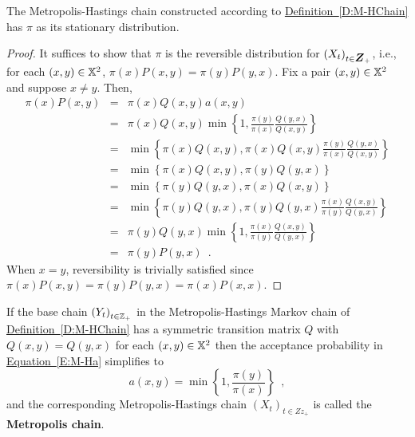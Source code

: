 \begin{prop}\label{P:M-HChainStationary}
The Metropolis-Hastings chain constructed according to \hyperref[D:M-HChain]{Definition~\ref*{D:M-HChain}} has $\pi$ as its stationary distribution.  
\begin{proof}
It suffices to show that $\pi$ is the reversible distribution for $\left(X_t\right)_{t\in \Z_+}$, i.e., for each $(x,y) \in \mathbb{X}^2$, $\pi(x)P(x,y) = \pi(y) P(y,x)$.  
Fix a pair $(x,y) \in \mathbb{X}^2$ and suppose $x\neq y$.  
Then,
\begin{eqnarray*}
\pi(x)P(x,y) 
&=& \pi(x) Q(x,y)a(x,y) \\
&=& \pi(x) Q(x,y) \min\left\{ 1, \frac{\pi(y)}{\pi(x)}\frac{Q(y,x)}{Q(x,y)} \right\} \\
&=& \min\left\{ \pi(x) Q(x,y), \pi(x) Q(x,y) \frac{\pi(y)}{\pi(x)}\frac{Q(y,x)}{Q(x,y)} \right\}\\
&=& \min\left\{ \pi(x) Q(x,y), \pi(y) Q(y,x) \right\}\\
&=& \min\left\{ \pi(y) Q(y,x), \pi(x) Q(x,y) \right\}\\
&=& \min\left\{ \pi(y) Q(y,x), \pi(y) Q(y,x) \frac{\pi(x)}{\pi(y)} \frac{Q(x,y)}{Q(y,x)} \right\}\\
&=& \pi(y) Q(y,x) \min\left\{ 1, \frac{\pi(x)}{\pi(y)} \frac{Q(x,y)}{Q(y,x)} \right\}\\
&=& \pi(y) P(y,x) \enspace .
\end{eqnarray*}
When $x=y$, reversibility is trivially satisfied since $\pi(x)P(x,y) = \pi(y) P(y,x)=\pi(x)P(x,x)$.
\end{proof}
\end{prop}

\begin{definition}\label{M:MetropolisChain}
If the base chain $\left(Y_t\right)_{t \in \mathbb{Z}_+}$ in the Metropolis-Hastings Markov chain of \hyperref[D:M-HChain]{Definition~\ref*{D:M-HChain}} has a symmetric transition matrix $Q$ with $Q(x,y)=Q(y,x)$ for each $(x,y)\in \mathbb{X}^2$ then the acceptance probability in \hyperref[E:M-Ha]{Equation~\ref*{E:M-Ha}} simplifies to
\[
a(x,y) =  \min\left\{1, \frac{\pi(y)}{\pi(x)} \right\} \enspace ,
\]
and the corresponding Metropolis-Hastings chain $\left(X_t\right)_{t\in Zz_+}$ is called the {\bf Metropolis chain}.
\end{definition}

